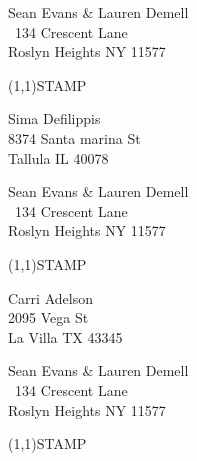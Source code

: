 \documentclass[12pt]{article}
\begin{document}
\begin{minipage}{.5\linewidth} \noindent
Sean Evans \& Lauren Demell\\\ 
134 Crescent Lane\\ 
Roslyn Heights NY 11577
\end{minipage}
\begin{minipage}{.5\linewidth \hspace{-.2in} \vspace{-.3in}}
\begin{flushright}
\framebox(1,1){STAMP}
\end{flushright}
\end{minipage}

\begin{center} \begin{Huge} \vspace*{\fill}
Sima Defilippis\\
8374 Santa marina St\\
Tallula IL 40078\\
\vspace{\fill} \end{Huge} \end{center}

\clearpage

\begin{minipage}{.5\linewidth} \noindent
Sean Evans \& Lauren Demell\\\ 
134 Crescent Lane\\ 
Roslyn Heights NY 11577
\end{minipage}
\begin{minipage}{.5\linewidth \hspace{-.2in} \vspace{-.3in}}
\begin{flushright}
\framebox(1,1){STAMP}
\end{flushright}
\end{minipage}

\begin{center} \begin{Huge} \vspace*{\fill}
Carri Adelson\\
2095 Vega St\\
La Villa TX 43345\\
\vspace{\fill} \end{Huge} \end{center}

\clearpage

\begin{minipage}{.5\linewidth} \noindent
Sean Evans \& Lauren Demell\\\ 
134 Crescent Lane\\ 
Roslyn Heights NY 11577
\end{minipage}
\begin{minipage}{.5\linewidth \hspace{-.2in} \vspace{-.3in}}
\begin{flushright}
\framebox(1,1){STAMP}
\end{flushright}
\end{minipage}
\end{document}
